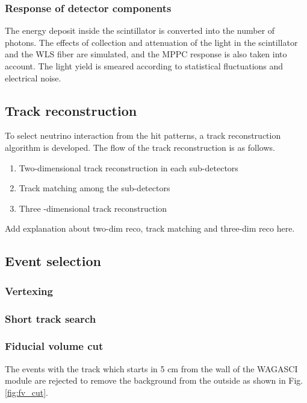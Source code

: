 \subsubsection{Response of detector components}
The energy deposit inside the scintillator is converted into the number of photons. 
The effects of collection and attenuation of the light in the scintillator and the WLS fiber are simulated, and the MPPC response is also taken into account. 
The light yield is smeared according to statistical fluctuations and electrical noise.


\subsection{Track reconstruction}
To select neutrino interaction from the hit patterns, a track reconstruction algorithm is developed.
The flow of the track reconstruction is as follows.
\begin{enumerate}
\item Two-dimensional track reconstruction in each sub-detectors
\item Track matching among the sub-detectors
\item Three -dimensional track reconstruction
\end{enumerate}

Add explanation about two-dim reco, track matching and three-dim reco here.


\subsection{Event selection}

\subsubsection{Vertexing}


\subsubsection{Short track search}


\subsubsection{Fiducial volume cut}
The events with the track which starts in 5 cm from the wall of the WAGASCI module are rejected to remove the background from the outside as shown in Fig. \ref{fig:fv_cut}.

